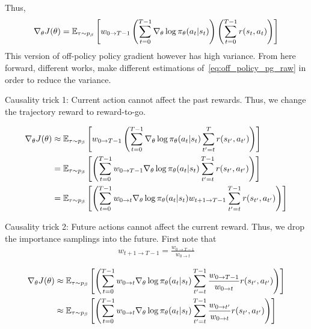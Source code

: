 \documentclass{article}
\begin{document}
Thus,
\begin{align}\label{eq:off_policy_pg_raw}
    \nabla_\theta J(\theta) = {\mathbb E}_{\tau \sim p_\beta} \left[w_{0 \to {T-1}} \left(\sum_{t=0}^{T-1} \nabla_\theta \log \pi_\theta(a_t\vert s_t)\right) \left(\sum_{t=0}^{T-1} r(s_t, a_t)\right) \right]
\end{align}
This version of off-policy policy gradient however has high variance.
From here forward, different works, make different estimations of~\eqref{eq:off_policy_pg_raw} in order to reduce the variance.

Causality trick 1: Current action cannot affect the past rewards. Thus, we change the trajectory reward to reward-to-go.

\begin{align*}
    \nabla_\theta J(\theta) &\approx {\mathbb E}_{\tau \sim p_\beta} \left[w_{0 \to {T-1}} \left(\sum_{t=0}^{T-1} \nabla_\theta \log \pi_\theta(a_t\vert s_t) \sum_{t^\prime=t}^T r(s_{t^\prime}, a_{t^\prime})\right) \right] \\
    &= {\mathbb E}_{\tau \sim p_\beta} \left[\left(\sum_{t=0}^{T-1} w_{0 \to {T-1}} \nabla_\theta \log \pi_\theta(a_t\vert s_t) \sum_{t^\prime=t}^{T-1} r(s_{t^\prime}, a_{t^\prime})\right) \right]\\
    &= {\mathbb E}_{\tau \sim p_\beta} \left[\left(\sum_{t=0}^{T-1} w_{0\to t} \nabla_\theta \log \pi_\theta(a_t\vert s_t) w_{{t+1} \to {T-1}} \sum_{t^\prime=t}^{T-1} r(s_{t^\prime}, a_{t^\prime})\right) \right]
\end{align*}

Causality trick 2: Future actions cannot affect the current reward. Thus, we drop the importance samplings into the future. First note that
\begin{align*}
    w_{{t+1} \to {T-1}} = \frac{w_{{0} \to {T-1}}}{w_{{0} \to {t}}}
\end{align*}

\begin{align}
\nabla_\theta J(\theta) &\approx {\mathbb E}_{\tau \sim p_\beta} \left[\left(\sum_{t=0}^{T-1} w_{0\to t} \nabla_\theta \log \pi_\theta(a_t\vert s_t)  \sum_{t^\prime=t}^{T-1} \frac{w_{{0} \to {T-1}}}{w_{{0} \to {t}}} r(s_{t^\prime}, a_{t^\prime})\right) \right]\nonumber\\
&\approx {\mathbb E}_{\tau \sim p_\beta} \left[\left(\sum_{t=0}^{T-1} w_{0\to t} \nabla_\theta \log \pi_\theta(a_t\vert s_t)  \sum_{t^\prime=t}^{T-1} \frac{w_{{0} \to {t^\prime}}}{w_{{0} \to {t}}} r(s_{t^\prime}, a_{t^\prime})\right) \right] \label{eq:off_policy_pg_after_causality1}
\end{align}
\end{document}
